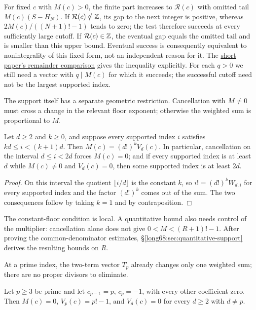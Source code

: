 \documentclass[11pt]{article}
\newcommand{\chn}[2]{V_{#1}(#2)}
\begin{document}
For fixed $c$ with $M(c)>0$, the finite part increases to
$\mathcal R(c)$ with omitted tail $M(c)(S-H_N)$. If
$\mathcal R(c)\notin\mathbb{Z}$, its gap to the next integer is positive,
whereas $2M(c)/((N+1)!-1)$ tends to zero; the test therefore succeeds
at every sufficiently large cutoff. If $\mathcal R(c)\in\mathbb{Z}$, the
eventual gap equals the omitted tail and is smaller than this upper
bound. Eventual success is consequently equivalent to nonintegrality
of this fixed form, not an independent reason for it. The
\href{erdos-68-factorial-denominator-irrationality.pdf\#r12-short-gap}{short paper's remainder comparison}
gives the inequality explicitly. For each $q>0$ we still need a vector
with $q\mid M(c)$ for which it succeeds; the successful cutoff need
not be the largest supported index.

The support itself has a separate geometric restriction. Cancellation
with $M\ne0$ must cross a change in the relevant floor exponent;
otherwise the weighted sum is proportional to $M$.

\begin{theorem}\label{long68:res:bandbreakpoint}
Let $d\ge2$ and $k\ge0$, and suppose every supported index $i$ satisfies
$kd\le i<(k+1)d$.  Then $M(c)=(d!)^k\chn dc$.  In particular, cancellation
on the interval $d\le i<2d$ forces $M(c)=0$; and if every supported index
is at least $d$ while $M(c)\ne0$ and $\chn dc=0$, then some supported index
is at least $2d$.
\end{theorem}

\begin{proof}
On this interval the quotient $\lfloor i/d\rfloor$ is the constant $k$, so
$i!=(d!)^kW_{d,i}$ for every supported index and the factor $(d!)^k$ comes
out of the sum.  The two consequences follow by taking $k=1$ and by
contraposition.
\end{proof}

The constant-floor condition is local. A quantitative bound also needs
control of the multiplier: cancellation alone does not give
$0<M<(R+1)!-1$. After proving the common-denominator estimates,
\S\ref{long68:sec:quantitative-support} derives the resulting bounds on $R$.

At a prime index, the two-term vector $T_p$ already changes only one
weighted sum; there are no proper divisors to eliminate.

\begin{theorem}\label{long68:res:translator}
Let $p\ge3$ be prime and let $c_{p-1}=p$, $c_p=-1$, with every other coefficient
zero.  Then $M(c)=0$, $\chn pc=p!-1$, and $\chn dc=0$ for every $d\ge2$ with
$d\ne p$.
\end{theorem}
\end{document}
